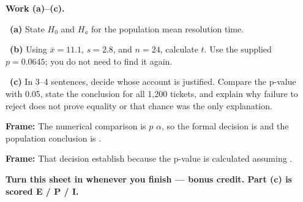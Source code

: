 \documentclass[11pt]{article}
\begin{document}
\newpage
\textbf{Work (a)--(c).}\par\smallskip

~\textbf{(a)} State $H_0$ and $H_a$ for the population mean resolution time.\par
\workspace{0.7in}

~\textbf{(b)} Using $\bar x=11.1$, $s=2.8$, and $n=24$, calculate $t$. Use the supplied $p=0.0645$; you do not need to find it again.\par
\workspace{1.5in}

~\textbf{(c)} In 3--4 sentences, decide whose account is justified. Compare the p-value with 0.05, state the conclusion for all 1,200 tickets, and explain why failure to reject does not prove equality or that chance was the only explanation.\par
\workspace{2.0in}

\begin{sentenceframebox}\raggedright\textbf{Frame:} The numerical comparison is $p$ \blank[0.6in] $\alpha$, so the formal decision is \blank[1.5in] and the population conclusion is \blank[2.1in].\end{sentenceframebox}

\begin{sentenceframebox}\raggedright\textbf{Frame:} That decision \blank[0.8in] establish \blank[1.8in] because the p-value is calculated assuming \blank[1.8in].\end{sentenceframebox}

\textbf{Turn this sheet in whenever you finish --- bonus credit. Part (c) is scored E / P / I.}\par
\end{document}
